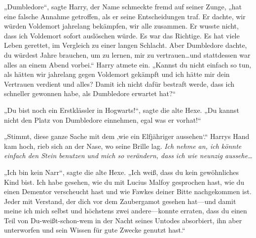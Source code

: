 „Dumbledore“, sagte Harry, der Name schmeckte fremd auf seiner Zunge, „hat eine falsche Annahme getroffen, als er seine Entscheidungen traf. Er dachte, wir würden Voldemort jahrelang bekämpfen, wir alle zusammen. Er wusste nicht, dass ich Voldemort sofort auslöschen würde. Es war das Richtige. Es hat viele Leben gerettet, im Vergleich zu einer langen Schlacht. Aber Dumbledore dachte, du würdest Jahre brauchen, um zu lernen, mir zu vertrauen…und stattdessen war alles an einem Abend vorbei.“
Harry atmete ein.
„Kannst du nicht einfach so tun, als hätten wir jahrelang gegen Voldemort gekämpft und ich hätte mir dein Vertrauen verdient und alles? Damit ich nicht dafür bestraft werde, dass ich schneller gewonnen habe, als Dumbledore erwartet hat?“

„Du bist noch ein Erstklässler in Hogwarts!“, sagte die alte Hexe. „Du kannst nicht den Platz von Dumbledore einnehmen, egal was er vorhat!“

„Stimmt, diese ganze Sache mit dem ‚wie ein Elfjähriger aussehen‘.“
Harrys Hand kam hoch, rieb sich an der Nase, wo seine Brille lag.
\emph{Ich nehme an, ich könnte einfach den Stein benutzen und mich so verändern, dass ich wie neunzig aussehe…}

„Ich bin kein Narr“, sagte die alte Hexe. „Ich weiß, dass du kein gewöhnliches Kind bist. Ich habe gesehen, wie du mit Lucius Malfoy gesprochen hast, wie du einen Dementor verscheucht hast und wie Fawkes deiner Bitte nachgekommen ist.
Jeder mit Verstand, der dich vor dem Zaubergamot gesehen hat—und damit meine ich mich selbst und höchstens zwei andere—konnte erraten, dass du einen Teil von Du-weißt-schon-wem in der Nacht seines Untodes absorbiert, ihn aber unterworfen und sein Wissen für gute Zwecke genutzt hast.“

